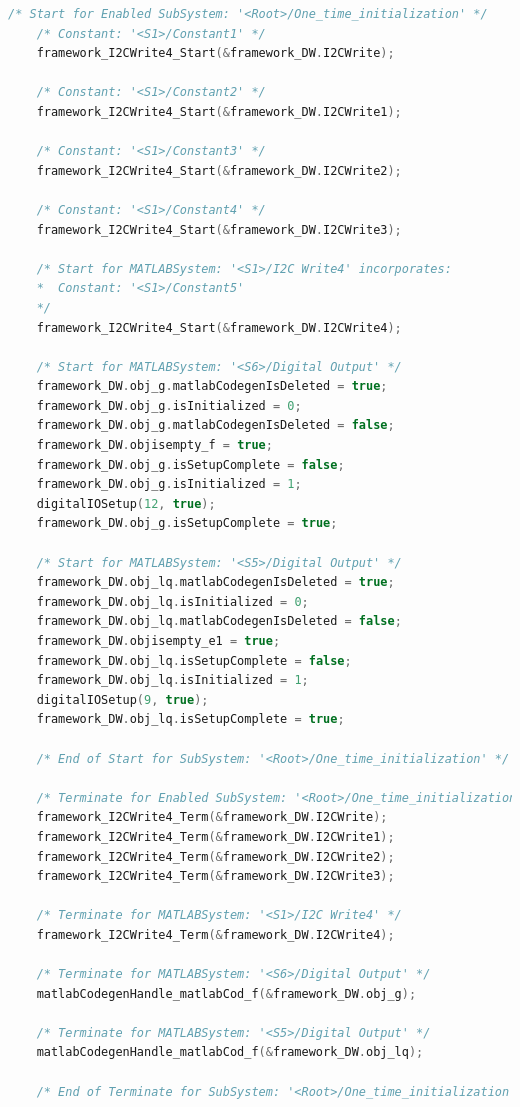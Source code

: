 	\begin{mdframed}
		\begin{lstlisting}[caption={Automatic generated C-Code from the model}, language=c,label={lst:init_real}]
	/* Start for Enabled SubSystem: '<Root>/One_time_initialization' */
	/* Constant: '<S1>/Constant1' */
	framework_I2CWrite4_Start(&framework_DW.I2CWrite);
	
	/* Constant: '<S1>/Constant2' */
	framework_I2CWrite4_Start(&framework_DW.I2CWrite1);
	
	/* Constant: '<S1>/Constant3' */
	framework_I2CWrite4_Start(&framework_DW.I2CWrite2);
	
	/* Constant: '<S1>/Constant4' */
	framework_I2CWrite4_Start(&framework_DW.I2CWrite3);
	
	/* Start for MATLABSystem: '<S1>/I2C Write4' incorporates:
	*  Constant: '<S1>/Constant5'
	*/
	framework_I2CWrite4_Start(&framework_DW.I2CWrite4);
	
	/* Start for MATLABSystem: '<S6>/Digital Output' */
	framework_DW.obj_g.matlabCodegenIsDeleted = true;
	framework_DW.obj_g.isInitialized = 0;
	framework_DW.obj_g.matlabCodegenIsDeleted = false;
	framework_DW.objisempty_f = true;
	framework_DW.obj_g.isSetupComplete = false;
	framework_DW.obj_g.isInitialized = 1;
	digitalIOSetup(12, true);
	framework_DW.obj_g.isSetupComplete = true;
	
	/* Start for MATLABSystem: '<S5>/Digital Output' */
	framework_DW.obj_lq.matlabCodegenIsDeleted = true;
	framework_DW.obj_lq.isInitialized = 0;
	framework_DW.obj_lq.matlabCodegenIsDeleted = false;
	framework_DW.objisempty_e1 = true;
	framework_DW.obj_lq.isSetupComplete = false;
	framework_DW.obj_lq.isInitialized = 1;
	digitalIOSetup(9, true);
	framework_DW.obj_lq.isSetupComplete = true;
	
	/* End of Start for SubSystem: '<Root>/One_time_initialization' */	
	
	/* Terminate for Enabled SubSystem: '<Root>/One_time_initialization' */
	framework_I2CWrite4_Term(&framework_DW.I2CWrite);
	framework_I2CWrite4_Term(&framework_DW.I2CWrite1);
	framework_I2CWrite4_Term(&framework_DW.I2CWrite2);
	framework_I2CWrite4_Term(&framework_DW.I2CWrite3);
	
	/* Terminate for MATLABSystem: '<S1>/I2C Write4' */
	framework_I2CWrite4_Term(&framework_DW.I2CWrite4);
	
	/* Terminate for MATLABSystem: '<S6>/Digital Output' */
	matlabCodegenHandle_matlabCod_f(&framework_DW.obj_g);
	
	/* Terminate for MATLABSystem: '<S5>/Digital Output' */
	matlabCodegenHandle_matlabCod_f(&framework_DW.obj_lq);
	
	/* End of Terminate for SubSystem: '<Root>/One_time_initialization' */		
		\end{lstlisting}
	\end{mdframed}

